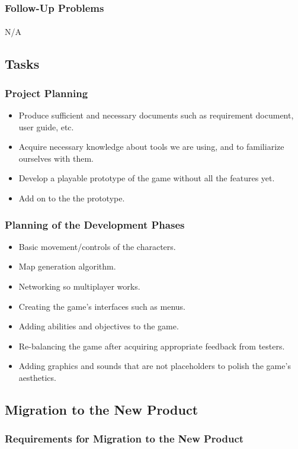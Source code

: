 \documentclass[12pt, titlepage]{article}
\begin{document}
\subsubsection{Follow-Up Problems}
\paragraph{}N/A
\subsection{Tasks}
\subsubsection{Project Planning}
\begin{itemize}
    \item Produce sufficient and necessary documents such as requirement document, user guide, etc. 
    \item Acquire necessary knowledge about tools we are using, and to familiarize ourselves with them. 
    \item Develop a playable prototype of the game without all the features yet. 
    \item Add on to the the prototype.
\end{itemize}
\subsubsection{Planning of the Development Phases}
\begin{itemize}
    \item Basic movement/controls of the characters.
    \item Map generation algorithm.
    \item Networking so multiplayer works.
    \item Creating the game's interfaces such as menus.
    \item Adding abilities and objectives to the game.
    \item Re-balancing the game after acquiring appropriate feedback from testers.
    \item Adding graphics and sounds that are not placeholders to polish the game's aesthetics.
\end{itemize}
\subsection{Migration to the New Product}
\subsubsection{Requirements for Migration to the New Product}
\end{document}
